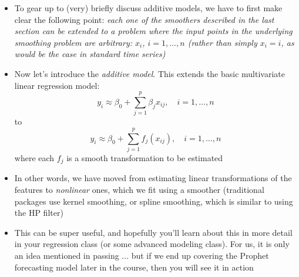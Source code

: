 \documentclass{article}
\begin{document}
\begin{itemize}
\item To gear up to (very) briefly discuss additive models, we have to first
  make clear the following point: \emph{each one of the smoothers described in
    the last section can be extended to a problem where the input points in the
    underlying smoothing problem are arbitrary: $x_i$, $i = 1,\dots,n$ (rather
    than simply $x_i = i$, as would be the case in standard time series)}

\item Now let's introduce the \emph{additive model}. This extends the basic
  multivariate linear regression model:
  \[
  y_i \approx \beta_0 + \sum_{j=1}^p \beta_j x_{ij}, \quad i = 1,\dots,n
  \]
  to 
  \[
  y_i \approx \beta_0 + \sum_{j=1}^p f_j(x_{ij}), \quad i = 1,\dots,n
  \]
  where each $f_j$ is a smooth transformation to be estimated

\item In other words, we have moved from estimating linear transformations of
  the features to \emph{nonlinear} ones, which we fit using a smoother
  (traditional packages use kernel smoothing, or spline smoothing, which is
  similar to using the HP filter) 

\item This can be super useful, and hopefully you'll learn about this in more
  detail in your regression class (or some advanced modeling class). For us, it
  is only an idea mentioned in passing ... but if we end up covering the Prophet 
  forecasting model later in the course, then you will see it in action 
\end{itemize}
\end{document}
